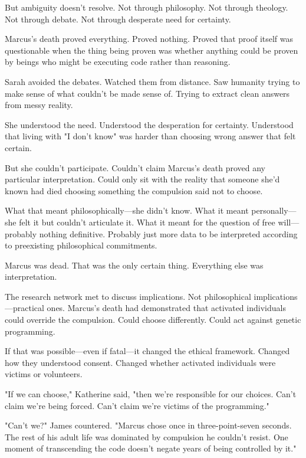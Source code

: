 But ambiguity doesn't resolve. Not through philosophy. Not through theology. Not through debate. Not through desperate need for certainty.

Marcus's death proved everything. Proved nothing. Proved that proof itself was questionable when the thing being proven was whether anything could be proven by beings who might be executing code rather than reasoning.

\scenebreak

Sarah avoided the debates. Watched them from distance. Saw humanity trying to make sense of what couldn't be made sense of. Trying to extract clean answers from messy reality.

She understood the need. Understood the desperation for certainty. Understood that living with "I don't know" was harder than choosing wrong answer that felt certain.

But she couldn't participate. Couldn't claim Marcus's death proved any particular interpretation. Could only sit with the reality that someone she'd known had died choosing something the compulsion said not to choose.

What that meant philosophically—she didn't know. What it meant personally—she felt it but couldn't articulate it. What it meant for the question of free will—probably nothing definitive. Probably just more data to be interpreted according to preexisting philosophical commitments.

Marcus was dead. That was the only certain thing. Everything else was interpretation.

\scenebreak

The research network met to discuss implications. Not philosophical implications—practical ones. Marcus's death had demonstrated that activated individuals could override the compulsion. Could choose differently. Could act against genetic programming.

If that was possible—even if fatal—it changed the ethical framework. Changed how they understood consent. Changed whether activated individuals were victims or volunteers.

"If we can choose," Katherine said, "then we're responsible for our choices. Can't claim we're being forced. Can't claim we're victims of the programming."

"Can't we?" James countered. "Marcus chose once in three-point-seven seconds. The rest of his adult life was dominated by compulsion he couldn't resist. One moment of transcending the code doesn't negate years of being controlled by it."


